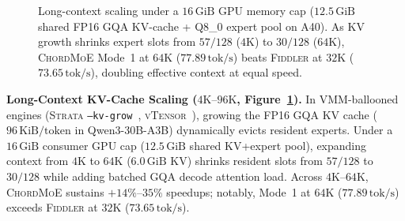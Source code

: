 \documentclass[10pt,twocolumn]{article}
\theoremstyle{definition}
\begin{document}
\begin{figure}[t]
  \centering
  \vspace{-6pt}
  \caption{Long-context scaling under a $16\,\text{GiB}$ GPU memory cap ($12.5\,\text{GiB}$ shared FP16 GQA KV-cache + Q8\_0 expert pool on A40). As KV growth shrinks expert slots from $57/128$ ($4\text{K}$) to $30/128$ ($64\text{K}$), \textsc{ChordMoE} Mode~1 at $64\text{K}$ ($77.89\,\text{tok/s}$) beats \textsc{Fiddler} at $32\text{K}$ ($73.65\,\text{tok/s}$), doubling effective context at equal speed.}
  \label{fig:sweep_ctx}
\end{figure}

\vspace{2pt}
\noindent\textbf{Long-Context KV-Cache Scaling ($4\text{K}\text{--}96\text{K}$, Figure~\ref{fig:sweep_ctx}).}
In VMM-ballooned engines (\textsc{Strata} \texttt{--kv-grow}~\cite{strata2026}, \textsc{vTensor}~\cite{xu2024vtensor}), growing the FP16 GQA KV cache ($96\,\text{KiB/token}$ in Qwen3-30B-A3B) dynamically evicts resident experts. Under a $16\,\text{GiB}$ consumer GPU cap ($12.5\,\text{GiB}$ shared KV+expert pool), expanding context from $4\text{K}$ to $64\text{K}$ ($6.0\,\text{GiB}$ KV) shrinks resident slots from $57/128$ to $30/128$ while adding batched GQA decode attention load. Across $4\text{K}\text{--}64\text{K}$, \textsc{ChordMoE} sustains $+14\%\text{--}35\%$ speedups; notably, Mode~1 at $64\text{K}$ ($77.89\,\text{tok/s}$) exceeds \textsc{Fiddler} at $32\text{K}$ ($73.65\,\text{tok/s}$).
\end{document}
